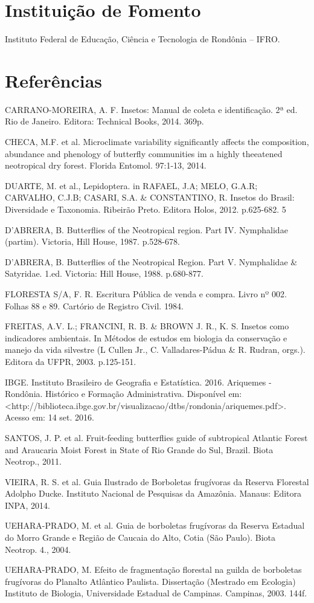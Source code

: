 \documentclass[article,12pt,onesidea,4paper,english,brazil]{abntex2}
\begin{document}
	\section*{Instituição de Fomento}
	
Instituto Federal de Educação, Ciência e Tecnologia de Rondônia – IFRO.
	
	\sloppy
	\section*{Referências}
	
	\noindent CARRANO-MOREIRA, A. F. Insetos: Manual de coleta e identificação. 2ª ed. Rio de Janeiro. Editora: Technical Books, 2014. 369p.
	
	\noindent CHECA, M.F. et al. Microclimate variability significantly affects the composition, abundance and phenology of butterfly communities im a highly theeatened neotropical dry forest. Florida Entomol. 97:1-13, 2014.
	
	\noindent	DUARTE, M. et al., Lepidoptera. in RAFAEL, J.A; MELO, G.A.R; CARVALHO, C.J.B;
	CASARI, S.A. \& CONSTANTINO, R. Insetos do Brasil: Diversidade e Taxonomia. Ribeirão Preto. Editora Holos, 2012. p.625-682.
	5
	
	\noindent D’ABRERA, B. Butterflies of the Neotropical region. Part IV. Nymphalidae (partim). Victoria, Hill House, 1987. p.528-678.
	
	\noindent D’ABRERA, B. Butterflies of the Neotropical Region. Part V. Nymphalidae \& Satyridae. 1.ed. Victoria: Hill House, 1988. p.680-877.
	
	\noindent FLORESTA S/A, F. R. Escritura Pública de venda e compra. Livro nº 002. Folhas 88 e 89. Cartório de Registro Civil. 1984.
	
	\noindent FREITAS, A.V. L.; FRANCINI, R. B. \& BROWN J. R., K. S. Insetos como indicadores ambientais. In Métodos de estudos em biologia da conservação e manejo da vida silvestre (L Cullen Jr., C. Valladares-Pádua \& R. Rudran, orgs.). Editora da UFPR, 2003. p.125-151.
	
	\noindent IBGE. Instituto Brasileiro de Geografia e Estatística. 2016. Ariquemes - Rondônia. Histórico e Formação Administrativa. Disponível em:
	<http://biblioteca.ibge.gov.br/visualizacao/dtbs/rondonia/ariquemes.pdf>. Acesso em: 14 set. 2016.
	
	\noindent SANTOS, J. P. et al. Fruit-feeding butterflies guide of subtropical Atlantic Forest and Araucaria Moist Forest in State of Rio Grande do Sul, Brazil. Biota Neotrop., 2011.
	
	\noindent VIEIRA, R. S. et al. Guia Ilustrado de Borboletas frugívoras da Reserva Florestal Adolpho Ducke. Instituto Nacional de Pesquisas da Amazônia. Manaus: Editora INPA, 2014.
	
	\noindent UEHARA-PRADO, M. et al. Guia de borboletas frugívoras da Reserva Estadual do Morro Grande e Região de Caucaia do Alto, Cotia (São Paulo). Biota Neotrop. 4., 2004.
	
	\noindent UEHARA-PRADO, M. Efeito de fragmentação florestal na guilda de borboletas frugívoras do Planalto Atlântico Paulista. Dissertação (Mestrado em Ecologia) Instituto de Biologia, Universidade Estadual de Campinas. Campinas, 2003. 144f.
	
\end{document}
